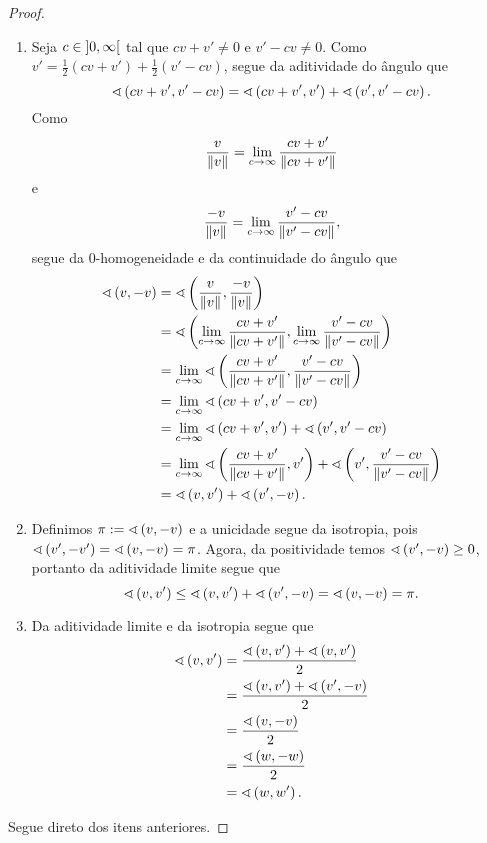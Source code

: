 \begin{proof}
	\begin{enumerate}
	\item Seja $c \in \intaa{0}{\infty}$ tal que $cv+v' \neq 0$ e $v'-cv \neq 0$. Como $v' = \frac{1}{2}(cv+v') + \frac{1}{2}(v'-cv)$, segue da aditividade do ângulo que
		\begin{equation*}
		\ang{cv+v'}{v'-cv} = \ang{cv+v'}{v'} + \ang{v'}{v'-cv}.
		\end{equation*}
	Como
		\begin{equation*}
		\frac{v}{\nor{v}} = \lim_{c \to \infty} \frac{cv+v'}{\nor{cv+v'}}
		\end{equation*}
	e
		\begin{equation*}
		\frac{-v}{\nor{v}} = \lim_{c \to \infty} \frac{v'-cv}{\nor{v'-cv}},
		\end{equation*}
	segue da $0$-homogeneidade e da continuidade do ângulo que
		\begin{align*}
		\ang{v}{-v} &= \ang{\frac{v}{\nor{v}}}{\frac{-v}{\nor{v}}} \\
			&= \ang{\lim_{c \to \infty} \frac{cv+v'}{\nor{cv+v'}}}{\lim_{c \to \infty} \frac{v'-cv}{\nor{v'-cv}}} \\
			&= \lim_{c \to \infty} \ang{\frac{cv+v'}{\nor{cv+v'}}}{\frac{v'-cv}{\nor{v'-cv}}} \\
			&= \lim_{c \to \infty} \ang{cv+v'}{v'-cv} \\
			&= \lim_{c \to \infty} \ang{cv+v'}{v'} + \ang{v'}{v'-cv} \\
			&= \lim_{c \to \infty} \ang{\frac{cv+v'}{\nor{cv+v'}}}{v'} + \ang{v'}{\frac{v'-cv}{\nor{v'-cv}}} \\
			&= \ang{v}{v'} + \ang{v'}{-v}.
		\end{align*}

	\item Definimos $\pi := \ang{v}{-v}$ e a unicidade segue da isotropia, pois $\ang{v'}{-v'} = \ang{v}{-v} = \pi$. Agora, da positividade temos $\ang{v'}{-v} \geq 0$, portanto da aditividade limite segue que
		\begin{equation*}
		\ang{v}{v'} \leq \ang{v}{v'} + \ang{v'}{-v} = \ang{v}{-v} = \pi.
		\end{equation*}

	\item Da aditividade limite e da isotropia segue que
		\begin{align*}
		\ang{v}{v'} &= \frac{\ang{v}{v'}+\ang{v}{v'}}{2} \\
			&= \frac{\ang{v}{v'}+\ang{v'}{-v}}{2} \\
			&= \frac{\ang{v}{-v}}{2} \\
			&= \frac{\ang{w}{-w}}{2} \\
			&= \ang{w}{w'}.
		\end{align*}
	\end{enumerate}

	\item Segue direto dos itens anteriores.
\end{proof}

